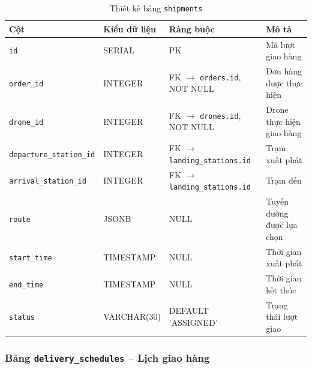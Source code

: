 \begin{table}[H]
\centering
\caption{Thiết kế bảng \texttt{shipments}}
\begin{tabularx}{\textwidth}{|l|l|Z|Z|}
\hline
\textbf{Cột} &
\textbf{Kiểu dữ liệu} &
\textbf{Ràng buộc} &
\textbf{Mô tả} \\ \hline

\texttt{id}
& SERIAL
& PK
& Mã lượt giao hàng \\ \hline

\texttt{order\_id}
& INTEGER
& FK $\rightarrow$ \texttt{orders.id}, NOT NULL
& Đơn hàng được thực hiện \\ \hline

\texttt{drone\_id}
& INTEGER
& FK $\rightarrow$ \texttt{drones.id}, NOT NULL
& Drone thực hiện giao hàng \\ \hline

\texttt{departure\_station\_id}
& INTEGER
& FK $\rightarrow$ \texttt{landing\_stations.id}
& Trạm xuất phát \\ \hline

\texttt{arrival\_station\_id}
& INTEGER
& FK $\rightarrow$ \texttt{landing\_stations.id}
& Trạm đến \\ \hline

\texttt{route}
& JSONB
& NULL
& Tuyến đường được lựa chọn \\ \hline

\texttt{start\_time}
& TIMESTAMP
& NULL
& Thời gian xuất phát \\ \hline

\texttt{end\_time}
& TIMESTAMP
& NULL
& Thời gian kết thúc \\ \hline

\texttt{status}
& VARCHAR(30)
& DEFAULT 'ASSIGNED'
& Trạng thái lượt giao \\ \hline

\end{tabularx}
\end{table}



\subsubsection{Bảng \texttt{delivery\_schedules} -- Lịch giao hàng}


